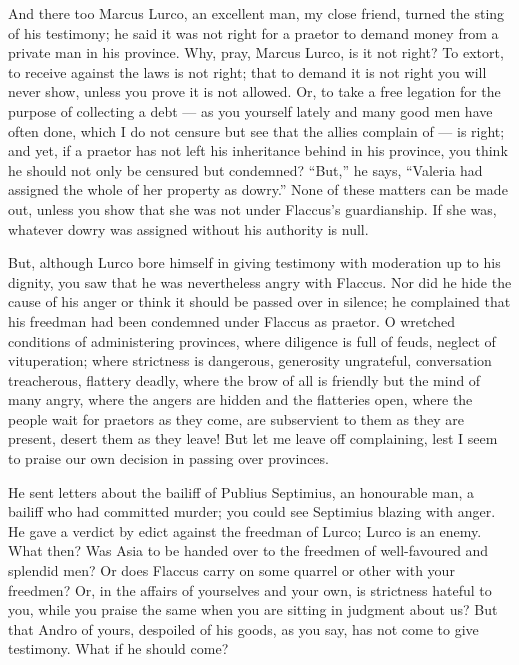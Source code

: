  And there too Marcus Lurco, an excellent man, my close friend, turned the sting of his testimony; he said it was not right for a praetor to demand money from a private man in his province. Why, pray, Marcus Lurco, is it not right? To extort, to receive against the laws is not right; that to demand it is not right you will never show, unless you prove it is not allowed. Or, to take a free legation for the purpose of collecting a debt --- as you yourself lately and many good men have often done, which I do not censure but see that the allies complain of --- is right; and yet, if a praetor has not left his inheritance behind in his province, you think he should not only be censured but condemned? ``But,'' he says, ``Valeria had assigned the whole of her property as dowry.'' None of these matters can be made out, unless you show that she was not under Flaccus's guardianship. If she was, whatever dowry was assigned without his authority is null.

 But, although Lurco bore himself in giving testimony with moderation up to his dignity, you saw that he was nevertheless angry with Flaccus. Nor did he hide the cause of his anger or think it should be passed over in silence; he complained that his freedman had been condemned under Flaccus as praetor. O wretched conditions of administering provinces, where diligence is full of feuds, neglect of vituperation; where strictness is dangerous, generosity ungrateful, conversation treacherous, flattery deadly, where the brow of all is friendly but the mind of many angry, where the angers are hidden and the flatteries open, where the people wait for praetors as they come, are subservient to them as they are present, desert them as they leave! But let me leave off complaining, lest I seem to praise our own decision in passing over provinces.

 He sent letters about the bailiff of Publius Septimius, an honourable man, a bailiff who had committed murder; you could see Septimius blazing with anger. He gave a verdict by edict against the freedman of Lurco; Lurco is an enemy. What then? Was Asia to be handed over to the freedmen of well-favoured and splendid men? Or does Flaccus carry on some quarrel or other with your freedmen? Or, in the affairs of yourselves and your own, is strictness hateful to you, while you praise the same when you are sitting in judgment about us? But that Andro of yours, despoiled of his goods, as you say, has not come to give testimony. What if he should come?

